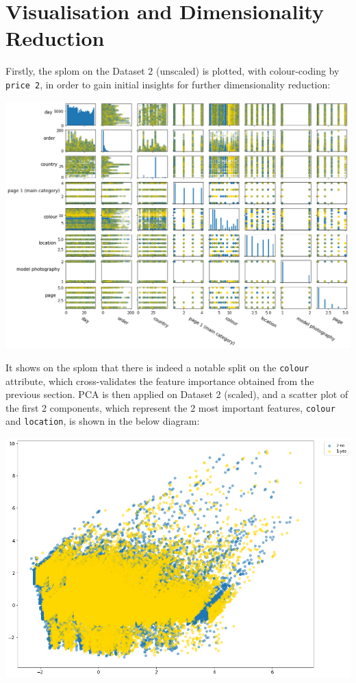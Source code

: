 \documentclass[12pt,twoside,a4paper]{article}
\begin{document}
\section{Visualisation and Dimensionality Reduction}

Firstly, the splom on the Dataset 2 (unscaled) is plotted, with colour-coding by \texttt{price 2}, in order to gain initial insights for further dimensionality reduction:

\begin{center}
\includegraphics[width=\linewidth]{images/splom.png}
\end{center}

It shows on the splom that there is indeed a notable split on the \texttt{colour} attribute, which cross-validates the feature importance obtained from the previous section. PCA is then applied on Dataset 2 (scaled), and a scatter plot of the first 2 components, which represent the 2 most important features, \texttt{colour} and \texttt{location}, is shown in the below diagram:

\begin{center}
\includegraphics[width=0.6\linewidth]{images/pca.png}
\end{center}
\end{document}
